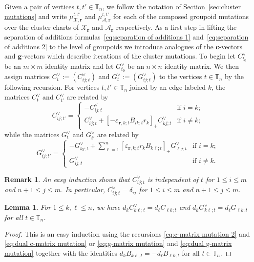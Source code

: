 \documentclass{amsart}
\newtheorem{lemma}[theorem]{Lemma}
\newtheorem{remark}[theorem]{Remark}
\numberwithin{equation}{section}
\newcommand{\bfc}{\mathbf{c}}
\newcommand{\bfg}{\mathbf{g}}
\newcommand{\bfr}{{\boldsymbol{r}}}
\newcommand{\cA}{\mathcal{A}}
\newcommand{\cX}{\mathcal{X}}
\newcommand{\TT}{\mathbb{T}}
\begin{document}
Given a pair of vertices $t,t'\in\TT_n$, we follow the notation of Section~\ref{sec:cluster mutations} and write $\mu_{\cX,\bfr}^{t,t'}$ and $\mu_{\cA,\bfr}^{t,t'}$ for each of the composed groupoid mutations over the cluster charts of $\cX_\bfr$ and $\cA_\bfr$ respectively.
As a first step in lifting the separation of additions formulas~\eqref{eq:separation of additions 1} and~\eqref{eq:separation of additions 2} to the level of groupoids we introduce analogues of the $\bfc$-vectors and $\bfg$-vectors which describe iterations of the cluster mutations.
To begin let $C^\vee_{t_0}$ be an $m\times m$ identity matrix and let $G^\vee_{t_0}$ be an $n\times n$ identity matrix.
We then assign matrices $C^\vee_t:=(C^\vee_{ij;t})$ and $G^\vee_t:=(G^\vee_{ij;t})$ to the vertices $t\in\TT_n$ by the following recursion.
For vertices $t,t'\in\TT_n$ joined by an edge labeled $k$, the matrices $C^\vee_t$ and $C^\vee_{t'}$ are related by
\begin{equation}
  \label{eq:dual c-matrix mutation}
  C^\vee_{ij;t'}=
  \begin{cases}
    -C^\vee_{ij;t} & \text{if $i=k$;}\\
    C^\vee_{ij;t}+[-\varepsilon_{\bfr,k;t} B_{ik;t} r_k]_+ C^\vee_{kj;t} & \text{if $i\ne k$;}
  \end{cases}
\end{equation}
while the matrices $G^\vee_t$ and $G^\vee_{t'}$ are related by
\begin{equation}
  \label{eq:dual g-matrix mutation}
  G^\vee_{ij;t'}=
  \begin{cases}
    -G^\vee_{kj;t}+\sum\limits_{\ell=1}^n [\varepsilon_{\bfr,k;t} r_k B_{k\ell;t}]_+ G^\vee_{\ell j;t} & \text{if $i=k$;}\\
    G^\vee_{ij;t} & \text{if $i\ne k$.}
  \end{cases}
\end{equation}
\begin{remark}
  An easy induction shows that $C^\vee_{ij;t}$ is independent of $t$ for $1\le i\le m$ and $n+1\le j\le m$.
  In particular, $C^\vee_{ij;t}=\delta_{ij}$ for $1\le i\le m$ and $n+1\le j\le m$.
\end{remark}
\begin{lemma}
  \label{le:dual C-vectors}
  For $1\le k,\ell\le n$, we have $d_kC^\vee_{k\ell;t}=d_\ell C_{\ell k;t}$ and $d_kG^\vee_{k\ell;t}=d_\ell G_{\ell k;t}$ for all $t\in\TT_n$.
\end{lemma}
\begin{proof}
  This is an easy induction using the recursions \eqref{eq:c-matrix mutation 2} and \eqref{eq:dual c-matrix mutation} or \eqref{eq:g-matrix mutation} and \eqref{eq:dual g-matrix mutation} together with the identities $d_k B_{k\ell;t}=-d_\ell B_{\ell k;t}$ for all $t\in\TT_n$.
\end{proof}
\end{document}
